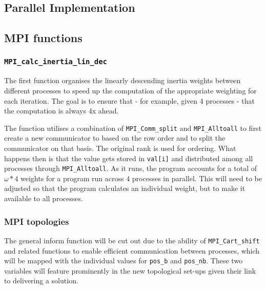 \documentclass[KomodoMain.tex]{subfiles}
\begin{document}
\subsection{Parallel Implementation}

\subsection{MPI functions}

\subsubsection{\texttt{MPI\_calc\_inertia\_lin\_dec}}

The first function organises the linearly descending inertia weights between different processes to speed up the computation of the appropriate weighting for each iteration. The goal is to ensure that - for example, given 4 processes - that the computation is always 4x ahead.
\par
The function utilises a combination of \texttt{MPI\_Comm\_split} and \texttt{MPI\_Alltoall} to first create a new communicator to based on the row order and to split the communicator on that basis. The original rank is used for ordering. What happens then is that the value gets stored in \texttt{val[i]} and distributed among all processes through \texttt{MPI\_Alltoall}. As it runs, the program accounts for a total of $\omega * 4$ weights for a program run across 4 processes in parallel. This will need to be adjusted so that the program calculates an individual weight, but to make it available to all processes.

\subsubsection{MPI topologies}

The general inform function will be cut out due to the ability of \texttt{MPI\_Cart\_shift} and related functions to enable efficient communication between processes, which will be mapped with the individual values for \texttt{pos\_b} and \texttt{pos\_nb}. These two variables will feature prominently in the new topological set-ups given their link to delivering a solution.
\end{document}
